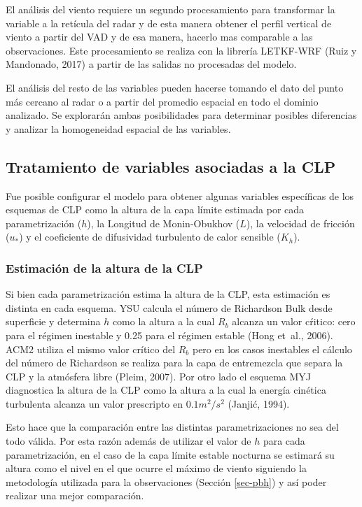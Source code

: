 \documentclass[12pt,spanish,oneside, a4paper]{book}
\begin{document}
El análisis del viento requiere un segundo procesamiento para
transformar la variable a la retícula del radar y de esta manera obtener
el perfil vertical de viento a partir del VAD y de esa manera, hacerlo
mas comparable a las observaciones. Este procesamiento se realiza con la
librería LETKF-WRF (Ruiz y Mandonado, 2017) a partir de las salidas no
procesadas del modelo.

El análisis del resto de las variables pueden hacerse tomando el dato
del punto más cercano al radar o a partir del promedio espacial en todo
el dominio analizado. Se explorarán ambas posibilidades para determinar
posibles diferencias y analizar la homogeneidad espacial de las
variables.

\subsection{Tratamiento de variables asociadas a la
CLP}\label{tratamiento-de-variables-asociadas-a-la-clp}

Fue posible configurar el modelo para obtener algunas variables
específicas de los esquemas de CLP como la altura de la capa límite
estimada por cada parametrización (\(h\)), la Longitud de Monin-Obukhov
(\(L\)), la velocidad de fricción (\(u_*\)) y el coeficiente de
difusividad turbulento de calor sensible (\(K_h\)).

\subsubsection{Estimación de la altura de la
CLP}\label{estimacion-de-la-altura-de-la-clp}

Si bien cada parametrización estima la altura de la CLP, esta estimación
es distinta en cada esquema. YSU calcula el número de Richardson Bulk
desde superficie y determina \(h\) como la altura a la cual \(R_b\)
alcanza un valor cŕitico: cero para el régimen inestable y 0.25 para el
régimen estable (Hong et~al., 2006). ACM2 utiliza el mismo valor crítico
del \(R_b\) pero en los casos inestables el cálculo del número de
Richardson se realiza para la capa de entremezcla que separa la CLP y la
atmósfera libre (Pleim, 2007). Por otro lado el esquema MYJ diagnostica
la altura de la CLP como la altura a la cual la energía cinética
turbulenta alcanza un valor prescripto en \(0.1 m^2/s^2\) (Janjić,
1994).

Esto hace que la comparación entre las distintas parametrizaciones no
sea del todo válida. Por esta razón además de utilizar el valor de \(h\)
para cada parametrización, en el caso de la capa límite estable nocturna
se estimará su altura como el nivel en el que ocurre el máximo de viento
siguiendo la metodología utilizada para la observaciones (Sección
\ref{sec-pbh}) y así poder realizar una mejor comparación.
\end{document}
